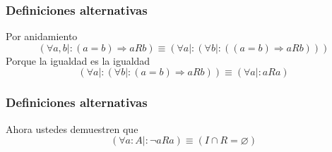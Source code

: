\documentclass{beamer}
\newcommand{\then}{\Rightarrow}
\begin{document}
\begin{frame}[fragile]
    \frametitle{Definiciones alternativas}
    Por anidamiento
    $$(\forall a, b \mid : (a=b) \then aRb ) \equiv (\forall a \mid : (\forall b \mid : ((a = b) \then aRb)))$$
    Porque la igualdad es la igualdad
    $$(\forall a \mid : (\forall b \mid : (a = b) \then aRb))\equiv (\forall a \mid : aRa)$$
\end{frame}

\begin{frame}[fragile]
    \frametitle{Definiciones alternativas}
    Ahora ustedes demuestren que
    $$(\forall a:A \mid : \lnot aRa) \equiv (I \cap R = \varnothing)$$
    \vspace{160pt}
\end{frame}
\end{document}
